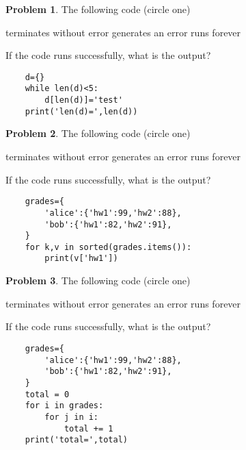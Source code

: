 \documentclass[10pt]{article}
\theoremstyle{definition}
\newtheorem{problem}{Problem}
\begin{document}
\begin{problem}
    The following code (circle one)

    \vspace{0.25in}
    \hspace{0.5in}terminates without error 
    \hspace{1in}generates an error
    \hspace{1in}runs forever
    \vspace{0.25in}

    \noindent
    If the code runs successfully, what is the output?
\end{problem}
\begin{lstlisting}
    d={}
    while len(d)<5:
        d[len(d)]='test'
    print('len(d)=',len(d))
\end{lstlisting}
\vspace{1in}

\newpage
\begin{problem}
    The following code (circle one)

    \vspace{0.25in}
    \hspace{0.5in}terminates without error 
    \hspace{1in}generates an error
    \hspace{1in}runs forever
    \vspace{0.25in}

    \noindent
    If the code runs successfully, what is the output?
\end{problem}
\begin{lstlisting}
    grades={
        'alice':{'hw1':99,'hw2':88},
        'bob':{'hw1':82,'hw2':91},
    }
    for k,v in sorted(grades.items()):
        print(v['hw1'])
\end{lstlisting}
\vspace{0.75in}

\begin{problem}
    The following code (circle one)

    \vspace{0.25in}
    \hspace{0.5in}terminates without error 
    \hspace{1in}generates an error
    \hspace{1in}runs forever
    \vspace{0.25in}

    \noindent
    If the code runs successfully, what is the output?
\end{problem}
\begin{lstlisting}
    grades={
        'alice':{'hw1':99,'hw2':88},
        'bob':{'hw1':82,'hw2':91},
    }
    total = 0
    for i in grades:
        for j in i:
            total += 1
    print('total=',total)
\end{lstlisting}
\vspace{0.75in}
\end{document}
